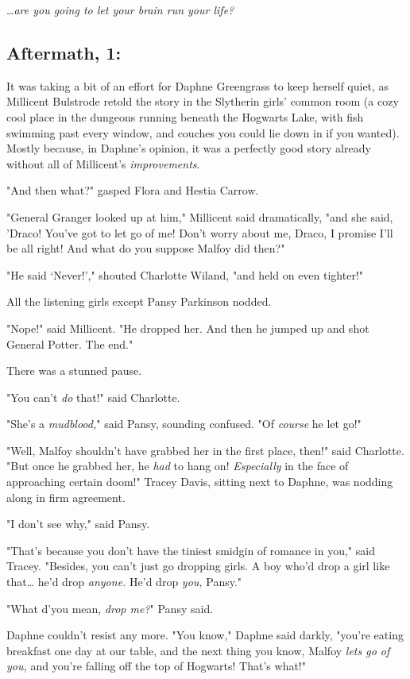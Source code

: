{\ldots}\emph{are you going to let your brain run your life?}
\sbreak
\subsection{Aftermath, 1:}

It was taking a bit of an effort for Daphne Greengrass to keep herself quiet, 
as Millicent Bulstrode retold the story in the Slytherin girls' common room (a 
cozy cool place in the dungeons running beneath the Hogwarts Lake, with fish 
swimming past every window, and couches you could lie down in if you wanted). 
Mostly because, in Daphne's opinion, it was a perfectly good story already 
without all of Millicent's \emph{improvements}.

"And then what?" gasped Flora and Hestia Carrow.

"General Granger looked up at him," Millicent said dramatically, "and she said, 
'Draco! You've got to let go of me! Don't worry about me, Draco, I promise I'll 
be all right! And what do you suppose Malfoy did then?"

"He said `Never!'," shouted Charlotte Wiland, "and held on even tighter!"

All the listening girls except Pansy Parkinson nodded.

"Nope!" said Millicent. "He dropped her. And then he jumped up and shot General 
Potter. The end."

There was a stunned pause.

"You can't \emph{do} that!" said Charlotte.

"She's a \emph{mudblood,}" said Pansy, sounding confused. "Of \emph{course} he 
let go!"

"Well, Malfoy shouldn't have grabbed her in the first place, then!" said 
Charlotte. "But once he grabbed her, he \emph{had} to hang on! 
\emph{Especially} in the face of approaching certain doom!" Tracey Davis, 
sitting next to Daphne, was nodding along in firm agreement.

"I don't see why," said Pansy.

"That's because you don't have the tiniest smidgin of romance in you," said 
Tracey. "Besides, you can't just go dropping girls. A boy who'd drop a girl 
like that{\ldots} he'd drop \emph{anyone.} He'd drop \emph{you,} Pansy."

"What d'you mean, \emph{drop me?}" Pansy said.

Daphne couldn't resist any more. "You know," Daphne said darkly, "you're eating 
breakfast one day at our table, and the next thing you know, Malfoy \emph{lets 
go of you,} and you're falling off the top of Hogwarts! That's what!"

